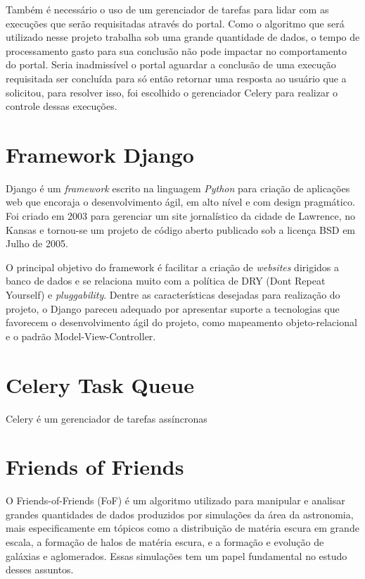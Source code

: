 \documentclass[tg]{mdtufsm}
\begin{document}
Também é necessário o uso de um gerenciador de tarefas para lidar com as execuções que serão requisitadas através do portal. Como o algoritmo que será utilizado nesse projeto trabalha sob uma grande quantidade de dados, o tempo de processamento gasto para sua conclusão não pode impactar no comportamento do portal. Seria inadmissível o portal aguardar a conclusão de uma execução requisitada ser concluída para só então retornar uma resposta ao usuário que a solicitou, para resolver isso, foi escolhido o gerenciador Celery para realizar o controle dessas execuções.

\section{Framework Django}
Django\cite{django} é um \emph{framework} escrito na linguagem \emph{Python} para criação de aplicações web que encoraja o desenvolvimento ágil, em alto nível e com design pragmático. Foi criado em 2003 para gerenciar um site jornalístico da cidade de Lawrence, no Kansas e tornou-se um projeto de código aberto publicado sob a licença BSD em Julho de 2005. 

O principal objetivo do framework é facilitar a criação de \emph{websites} dirigidos a banco de dados e se relaciona muito com a política de DRY (Dont Repeat Yourself) e \emph{pluggability}. Dentre as características desejadas para realização do projeto, o Django pareceu adequado por apresentar suporte a tecnologias que favorecem o desenvolvimento ágil do projeto, como mapeamento objeto-relacional e o padrão Model-View-Controller.

\section{Celery Task Queue}
Celery é um gerenciador de tarefas assíncronas 


\section{Friends of Friends}
O Friends-of-Friends (FoF) é um algoritmo utilizado para manipular e analisar grandes quantidades de dados produzidos por simulações da área da astronomia, mais especificamente em tópicos como a distribuição de matéria escura em grande escala, a formação de halos de matéria escura, e a formação e evolução de galáxias e aglomerados. Essas simulações tem um papel fundamental\cite{Bertschinger,Efstathiou} no estudo desses assuntos.
\end{document}
